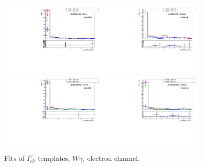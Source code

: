 \begin{figure}[htb]
\begin{center}
   \includegraphics[width=0.45\textwidth]{../figs/figs_v11/ELECTRON_WGamma/TemplateFits/c_TEMPL_CHISO_UNblind__phoEt95to120__Barrel__RooFit.pdf}\includegraphics[width=0.45\textwidth]{../figs/figs_v11/ELECTRON_WGamma/TemplateFits/c_TEMPL_CHISO_UNblind__phoEt95to120__Endcap__RooFit.pdf}\\
   \includegraphics[width=0.45\textwidth]{../figs/figs_v11/ELECTRON_WGamma/TemplateFits/c_TEMPL_CHISO_UNblind__phoEt120to500__Barrel__RooFit.pdf}\includegraphics[width=0.45\textwidth]{../figs/figs_v11/ELECTRON_WGamma/TemplateFits/c_TEMPL_CHISO_UNblind__phoEt120to500__Endcap__RooFit.pdf}\\
  \label{fig:templateFits_CHISO_ELECTRON_3}
  \caption{Fits of $I_{ch}^{\gamma}$ templates, $W\gamma$, electron channel.}
  \end{center}
\end{figure}

